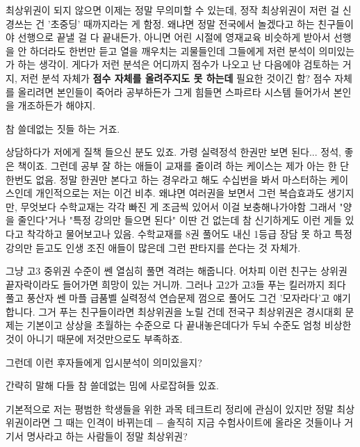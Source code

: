 최상위권이 되지 않으면 이제는 정말 무의미할 수 있는데, 정작 최상위권이 저런 걸 신경쓰는 건 '초중딩' 때까지라는 게 함정.
왜냐면 정말 전국에서 놀겠다고 하는 친구들이야 선행으로 끝낼 걸 다 끝내든가, 아니면 어린 시절에 영재교육 비슷하게 받아서
선행을 안 하더라도 한번만 듣고 열을 깨우치는 괴물들인데 그들에게 저런 분석이 의미있는가 하는 생각이.
게다가 저런 분석은 어디까지 점수가 나오고 난 다음에야 검토하는 거지,
저런 분석 자체가 \textbf{점수 자체를 올려주지도 못 하는데} 필요한 것이긴 함?
점수 자체를 올리려면 본인들이 죽어라 공부하든가 그게 힘들면 스파르타 시스템 들어가서 본인을 개조하든가 해야지.
\vspace{5mm}

참 쓸데없는 짓들 하는 거죠.
\vspace{5mm}

상담하다가 저에게 질책 들으신 분도 있죠. 가령 실력정석 한권만 보면 된다... 정석, 좋은 책이죠.
그런데 공부 잘 하는 애들이 교재를 줄이려 하는 케이스는 제가 아는 한 단 한번도 없음.
정말 한권만 본다고 하는 경우라고 해도 수십번을 봐서 마스터하는 케이스인데 개인적으로는 저는 이건 비추.
왜냐면 여러권을 보면서 그런 복습효과도 생기지만, 무엇보다 수학교재는 각각 빠진 게 조금씩 있어서 이걸 보충해나가야함
그래서 "양을 줄인다"거나 "특정 강의만 들으면 된다" 이딴 건 없는데 참 신기하게도 이런 게들 있다고 착각하고 물어보고나 있음.
수학교재를 8권 풀어도 내신 1등급 장담 못 하고 특정 강의만 듣고도 인생 조진 애들이 많은데 그런 판타지를 쓴다는 것 자체가.
\vspace{5mm}

그냥 고3 중위권 수준이 쎈 열심히 풀면 격려는 해줍니다. 어차피 이런 친구는 상위권 끝자락이라도 들어가면 희망이 있는 거니까.
그러나 고2가 고3들 푸는 킬러까지 죄다 풀고 풍산자 쎈 마플 급품벨 실력정석 연습문제 껌으로 풀어도 그건 '모자라다'고 얘기합니다.
그거 푸는 친구들이라면 최상위권을 노릴 건데 전국구 최상위권은 경시대회 문제는 기본이고 상상을 초월하는 수준으로 다 끝내놓은데다가
두뇌 수준도 엄청 비상한 것이 아니기 때문에 저것만으로도 부족하죠.
\vspace{5mm}

그런데 이런 후자들에게 입시분석이 의미있을지?
\vspace{5mm}

간략히 말해 다들 참 쓸데없는 밈에 사로잡혀들 있죠.
\vspace{5mm}

기본적으로 저는 평범한 학생들을 위한 과목 테크트리 정리에 관심이 있지만
정말 최상위권이라면 그 때는 인격이 바뀌는데 $-$ 솔직히 지금 수험사이트에 올라온 것들이나
거기서 명사라고 하는 사람들이 정말 최상위권?
\vspace{5mm}

